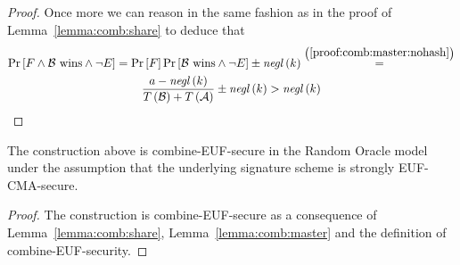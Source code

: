 \begin{proof}
      Once more we can reason in the same fashion as in the proof of
      Lemma~\ref{lemma:comb:share} to deduce that
      \begin{gather*}
        \Pr\left[F \wedge \mathcal{B} \text{ wins} \wedge \neg E\right] =
        \Pr\left[F\right] \Pr\left[\mathcal{B} \text{ wins} \wedge \neg E\right]
        \pm \mathit{negl}\left(k\right)
        \overset{\left(\ref{proof:comb:master:nohash}\right)}{=} \\
        \frac{a - \mathit{negl}\left(k\right)}{T\left(\mathcal{B}\right) +
        T\left(\mathcal{A}\right)} \pm \mathit{negl}\left(k\right) >
        \mathit{negl}\left(k\right)
      \end{gather*}
    \end{proof}

    \begin{theorem}
      \label{thm:combsign}
      The construction above is \textsf{combine-EUF}-secure in the Random Oracle
      model under the assumption that the underlying signature scheme is
      strongly \textsf{EUF-CMA}-secure.
    \end{theorem}

    \begin{proof}
      The construction is \textsf{combine-EUF}-secure as a consequence of
      Lemma~\ref{lemma:comb:share}, Lemma~\ref{lemma:comb:master} and the
      definition of \textsf{combine-EUF}-security.
    \end{proof}
